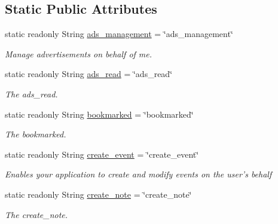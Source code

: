 \subsection*{Static Public Attributes}
\begin{DoxyCompactItemize}
\item 
static readonly String \hyperlink{classcom_1_1shephertz_1_1app42_1_1paas_1_1sdk_1_1csharp_1_1social_1_1_f_b_perms_a7081e128f11c291eca7640163c3032e7}{ads\+\_\+management} = \char`\"{}ads\+\_\+management\char`\"{}
\begin{DoxyCompactList}\small\item\em Manage advertisements on behalf of me. \end{DoxyCompactList}\item 
static readonly String \hyperlink{classcom_1_1shephertz_1_1app42_1_1paas_1_1sdk_1_1csharp_1_1social_1_1_f_b_perms_a167a94550253d790f82cee381729c4f9}{ads\+\_\+read} = \char`\"{}ads\+\_\+read\char`\"{}
\begin{DoxyCompactList}\small\item\em The ads\+\_\+read. \end{DoxyCompactList}\item 
static readonly String \hyperlink{classcom_1_1shephertz_1_1app42_1_1paas_1_1sdk_1_1csharp_1_1social_1_1_f_b_perms_a9848818914b14ee9f75f306500ba6f1d}{bookmarked} = \char`\"{}bookmarked\char`\"{}
\begin{DoxyCompactList}\small\item\em The bookmarked. \end{DoxyCompactList}\item 
static readonly String \hyperlink{classcom_1_1shephertz_1_1app42_1_1paas_1_1sdk_1_1csharp_1_1social_1_1_f_b_perms_a3fa4b29cb092244e95907f1bfd2df4ba}{create\+\_\+event} = \char`\"{}create\+\_\+event\char`\"{}
\begin{DoxyCompactList}\small\item\em Enables your application to create and modify events on the user's behalf \end{DoxyCompactList}\item 
static readonly String \hyperlink{classcom_1_1shephertz_1_1app42_1_1paas_1_1sdk_1_1csharp_1_1social_1_1_f_b_perms_a64d1905540335dd03e31f9a5bfaa875d}{create\+\_\+note} = \char`\"{}create\+\_\+note\char`\"{}
\begin{DoxyCompactList}\small\item\em The create\+\_\+note. \end{DoxyCompactList}\item 

\end{DoxyCompactItemize}
